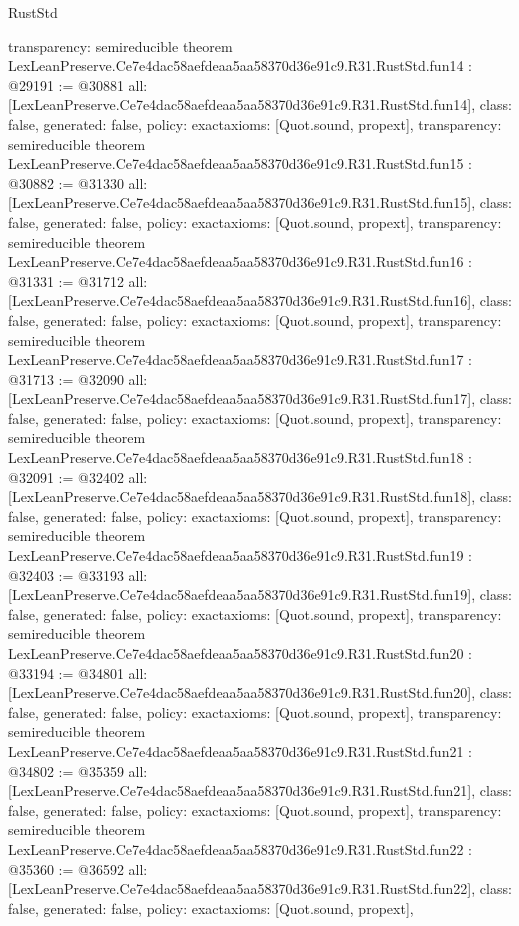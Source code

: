 \begin{lexlean}{RustStd}
\begin{coremodule}
{  transparency: semireducible
}
theorem LexLeanPreserve.Ce7e4dac58aefdeaa5aa58370d36e91c9.R31.RustStd.fun14 : @29191 := @30881 {
  all: [LexLeanPreserve.Ce7e4dac58aefdeaa5aa58370d36e91c9.R31.RustStd.fun14],
  class: false,
  generated: false,
  policy: exact{axioms: [Quot.sound, propext]},
  transparency: semireducible
}
theorem LexLeanPreserve.Ce7e4dac58aefdeaa5aa58370d36e91c9.R31.RustStd.fun15 : @30882 := @31330 {
  all: [LexLeanPreserve.Ce7e4dac58aefdeaa5aa58370d36e91c9.R31.RustStd.fun15],
  class: false,
  generated: false,
  policy: exact{axioms: [Quot.sound, propext]},
  transparency: semireducible
}
theorem LexLeanPreserve.Ce7e4dac58aefdeaa5aa58370d36e91c9.R31.RustStd.fun16 : @31331 := @31712 {
  all: [LexLeanPreserve.Ce7e4dac58aefdeaa5aa58370d36e91c9.R31.RustStd.fun16],
  class: false,
  generated: false,
  policy: exact{axioms: [Quot.sound, propext]},
  transparency: semireducible
}
theorem LexLeanPreserve.Ce7e4dac58aefdeaa5aa58370d36e91c9.R31.RustStd.fun17 : @31713 := @32090 {
  all: [LexLeanPreserve.Ce7e4dac58aefdeaa5aa58370d36e91c9.R31.RustStd.fun17],
  class: false,
  generated: false,
  policy: exact{axioms: [Quot.sound, propext]},
  transparency: semireducible
}
theorem LexLeanPreserve.Ce7e4dac58aefdeaa5aa58370d36e91c9.R31.RustStd.fun18 : @32091 := @32402 {
  all: [LexLeanPreserve.Ce7e4dac58aefdeaa5aa58370d36e91c9.R31.RustStd.fun18],
  class: false,
  generated: false,
  policy: exact{axioms: [Quot.sound, propext]},
  transparency: semireducible
}
theorem LexLeanPreserve.Ce7e4dac58aefdeaa5aa58370d36e91c9.R31.RustStd.fun19 : @32403 := @33193 {
  all: [LexLeanPreserve.Ce7e4dac58aefdeaa5aa58370d36e91c9.R31.RustStd.fun19],
  class: false,
  generated: false,
  policy: exact{axioms: [Quot.sound, propext]},
  transparency: semireducible
}
theorem LexLeanPreserve.Ce7e4dac58aefdeaa5aa58370d36e91c9.R31.RustStd.fun20 : @33194 := @34801 {
  all: [LexLeanPreserve.Ce7e4dac58aefdeaa5aa58370d36e91c9.R31.RustStd.fun20],
  class: false,
  generated: false,
  policy: exact{axioms: [Quot.sound, propext]},
  transparency: semireducible
}
theorem LexLeanPreserve.Ce7e4dac58aefdeaa5aa58370d36e91c9.R31.RustStd.fun21 : @34802 := @35359 {
  all: [LexLeanPreserve.Ce7e4dac58aefdeaa5aa58370d36e91c9.R31.RustStd.fun21],
  class: false,
  generated: false,
  policy: exact{axioms: [Quot.sound, propext]},
  transparency: semireducible
}
theorem LexLeanPreserve.Ce7e4dac58aefdeaa5aa58370d36e91c9.R31.RustStd.fun22 : @35360 := @36592 {
  all: [LexLeanPreserve.Ce7e4dac58aefdeaa5aa58370d36e91c9.R31.RustStd.fun22],
  class: false,
  generated: false,
  policy: exact{axioms: [Quot.sound, propext]},
}
\end{coremodule}
\end{lexlean}

